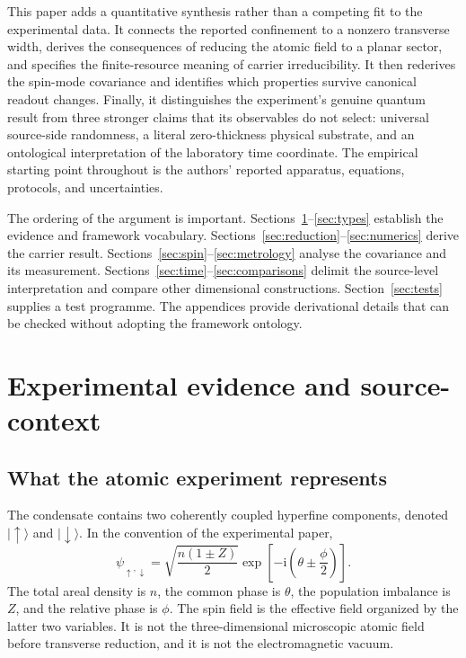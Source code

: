 \documentclass[11pt,a4paper]{article}
\theoremstyle{definition}
\theoremstyle{remark}
\newcommand{\ii}{\mathrm{i}}
\begin{document}
This paper adds a quantitative synthesis rather than a competing fit to the experimental data. It connects the reported confinement to a nonzero transverse width, derives the consequences of reducing the atomic field to a planar sector, and specifies the finite-resource meaning of carrier irreducibility. It then rederives the spin-mode covariance and identifies which properties survive canonical readout changes. Finally, it distinguishes the experiment's genuine quantum result from three stronger claims that its observables do not select: universal source-side randomness, a literal zero-thickness physical substrate, and an ontological interpretation of the laboratory time coordinate. The empirical starting point throughout is the authors' reported apparatus, equations, protocols, and uncertainties.\cite{zhang2026}

The ordering of the argument is important. Sections~\ref{sec:evidence}--\ref{sec:types} establish the evidence and framework vocabulary. Sections~\ref{sec:reduction}--\ref{sec:numerics} derive the carrier result. Sections~\ref{sec:spin}--\ref{sec:metrology} analyse the covariance and its measurement. Sections~\ref{sec:time}--\ref{sec:comparisons} delimit the source-level interpretation and compare other dimensional constructions. Section~\ref{sec:tests} supplies a test programme. The appendices provide derivational details that can be checked without adopting the framework ontology.

\section{Experimental evidence and source-context}
\label{sec:evidence}
\subsection{What the atomic experiment represents}
The condensate contains two coherently coupled hyperfine components, denoted $\lvert\uparrow\rangle$ and $\lvert\downarrow\rangle$. In the convention of the experimental paper,
\begin{equation}
 \psi_{\uparrow,\downarrow}
 =\sqrt{\frac{n(1\pm Z)}{2}}
   \exp\!\left[-\ii\left(\theta\pm\frac{\phi}{2}\right)\right].
 \label{eq:spinor}
\end{equation}
The total areal density is $n$, the common phase is $\theta$, the population imbalance is $Z$, and the relative phase is $\phi$. The spin field is the effective field organized by the latter two variables. It is not the three-dimensional microscopic atomic field before transverse reduction, and it is not the electromagnetic vacuum.\cite{zhang2026}
\end{document}

